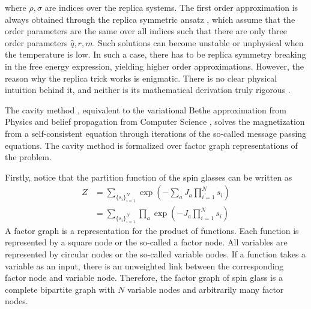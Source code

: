 \documentclass[%
 reprint,
 amsmath,amssymb,
 aps,
]{revtex4-2}
\begin{document}
where $\rho, \sigma$ are indices over the replica systems. The first order approximation is always obtained through the replica symmetric ansatz \cite{huang2021statistical_replica_sym}, which assume that the order parameters are the same over all indices such that there are only three order parameters $\hat{q},r,m$. Such solutions can become unstable or unphysical when the temperature is low. In such a case, there has to be replica symmetry breaking \cite{huang2021statistical_replica_sym_break} in the free energy expression, yielding higher order approximations. However, the reason why the replica trick works is enigmatic. There is no clear physical intuition behind it, and neither is its mathematical derivation truly rigorous \cite{huang2021statistical_replica_trick}. 

The cavity method \cite{huang2021statistical_cavity}, equivalent to the variational Bethe approximation from Physics and belief propagation from Computer Science \cite{huang2021statistical_Bethe}, solves the magnetization from a self-consistent equation through iterations of the so-called message passing equations. The cavity method is formalized over factor graph representations of the problem. 

Firstly, notice that the partition function of the spin glasses can be written as
\begin{equation}
\begin{split}
            Z 
        &= \sum_{\{ s_i \}_{i=1}^N}\exp{\left( -\sum_{a} J_{a} \prod_{i=1}^N s_i \right)}\\ 
        &= \sum_{\{ s_i \}_{i=1}^N}\prod_{a} \exp{\left(- J_{a} \prod_{i=1}^N s_i \right)}
\end{split}
    \label{eq:spinglass_Z}
\end{equation}
A factor graph is a representation for the product of functions. Each function is represented by a square node or the so-called a factor node. All variables are represented by circular nodes or the so-called variable nodes. If a function takes a variable as an input, there is an unweighted link between the corresponding factor node and variable node. Therefore, the factor graph of spin glass is a complete bipartite graph with $N$ variable nodes and arbitrarily many factor nodes. 
\end{document}
